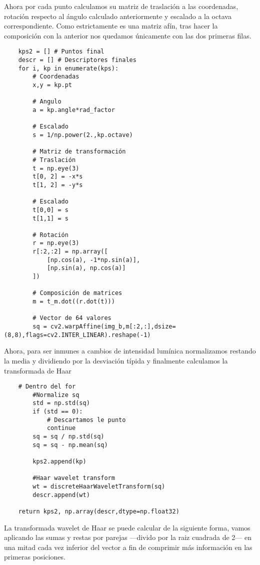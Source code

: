 \documentclass{article}
\begin{document}
Ahora por cada punto calculamos su matriz de traslación a las coordenadas, rotación respecto al ángulo calculado anteriormente y escalado a la octava correspondiente. Como estrictamente es una matriz afín, tras hacer la composición con la anterior nos quedamos únicamente con las dos primeras filas.

\begin{lstlisting}
    kps2 = [] # Puntos final
    descr = [] # Descriptores finales
    for i, kp in enumerate(kps):
        # Coordenadas
        x,y = kp.pt
        
        # Angulo
        a = kp.angle*rad_factor
        
        # Escalado
        s = 1/np.power(2.,kp.octave)

        # Matriz de transformación
        # Traslación
        t = np.eye(3)
        t[0, 2] = -x*s
        t[1, 2] = -y*s
		
        # Escalado
        t[0,0] = s
        t[1,1] = s
        
        # Rotación
        r = np.eye(3)
        r[:2,:2] = np.array([
            [np.cos(a), -1*np.sin(a)],
            [np.sin(a), np.cos(a)]
        ])
        
        # Composición de matrices
        m = t_m.dot((r.dot(t)))
		
		# Vector de 64 valores
        sq = cv2.warpAffine(img_b,m[:2,:],dsize=(8,8),flags=cv2.INTER_LINEAR).reshape(-1)

\end{lstlisting}

Ahora, para ser inmunes a cambios de intensidad lumínica normalizamos restando la media y dividiendo por la desviación típida y finalmente calculamos la transformada de Haar

\begin{lstlisting}
    # Dentro del for
        #Normalize sq
        std = np.std(sq)
        if (std == 0):
            # Descartamos le punto
            continue
        sq = sq / np.std(sq)
        sq = sq - np.mean(sq)

        kps2.append(kp)

        #Haar wavelet transform
        wt = discreteHaarWaveletTransform(sq)
        descr.append(wt)

    return kps2, np.array(descr,dtype=np.float32)
\end{lstlisting}

La transformada wavelet de Haar se puede calcular de la siguiente forma, vamos aplicando las sumas y restas por parejas ---divido por la raiz cuadrada de 2--- en una mitad cada vez inferior del vector a fin de comprimir más información en las primeras posiciones.
\end{document}
